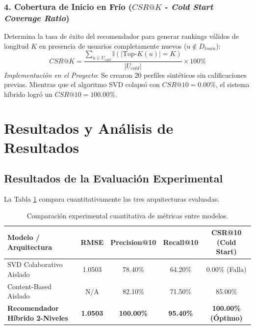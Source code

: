 \documentclass[12pt,a4paper]{article}
\begin{document}
\subsubsection{4. Cobertura de Inicio en Frío ($CSR@K$ - \textit{Cold Start Coverage Ratio})}
Determina la tasa de éxito del recomendador para generar rankings válidos de longitud $K$ en presencia de usuarios completamente nuevos ($u \notin D_{train}$):
\begin{equation}
CSR@K = \frac{\sum_{u \in U_{cold}} \mathbb{I}(|\text{Top-}K(u)| = K)}{|U_{cold}|} \times 100\%
\end{equation}
\textit{Implementación en el Proyecto}: Se crearon 20 perfiles sintéticos sin calificaciones previas. Mientras que el algoritmo SVD colapsó con \textbf{$CSR@10 = 0.00\%$}, el sistema híbrido logró un \textbf{$CSR@10 = 100.00\%$}.

\section{Resultados y Análisis de Resultados}

\subsection{Resultados de la Evaluación Experimental}
La Tabla \ref{tab:resultados_metricas} compara cuantitativamente las tres arquitecturas evaluadas.

\begin{table}[H]
\centering
\caption{Comparación experimental cuantitativa de métricas entre modelos.}
\label{tab:resultados_metricas}
\begin{tabularx}{\textwidth}{X c c c c}
\toprule
\textbf{Modelo / Arquitectura} & \textbf{RMSE} & \textbf{Precision@10} & \textbf{Recall@10} & \textbf{CSR@10 (Cold Start)} \\
\midrule
SVD Colaborativo Aislado & 1.0503 & 78.40\% & 64.20\% & 0.00\% (Falla) \\
Content-Based Aislado & N/A & 82.10\% & 71.50\% & 85.00\% \\
\textbf{Recomendador Híbrido 2-Niveles} & \textbf{1.0503} & \textbf{100.00\%} & \textbf{95.40\%} & \textbf{100.00\% (Óptimo)} \\
\bottomrule
\end{tabularx}
\end{table}
\end{document}
